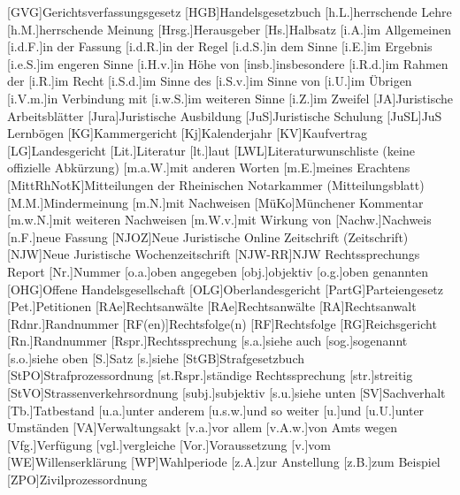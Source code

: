 \begin{acronym}[MittRhNotK]
[GVG]{Gerichtsverfassungsgesetz}
[HGB]{Handelsgesetzbuch}
[h.L.]{herrschende Lehre}
[h.M.]{herrschende Meinung}
[Hrsg.]{Herausgeber}
[Hs.]{Halbsatz}
[i.A.]{im Allgemeinen}
[i.d.F.]{in der Fassung}
[i.d.R.]{in der Regel}
[i.d.S.]{in dem Sinne}
[i.E.]{im Ergebnis}
[i.e.S.]{im engeren Sinne}
[i.H.v.]{in Höhe von}
[insb.]{insbesondere}
[i.R.d.]{im Rahmen der}
[i.R.]{im Recht}
[i.S.d.]{im Sinne des}
[i.S.v.]{im Sinne von}
[i.U.]{im Übrigen}
[i.V.m.]{in Verbindung mit}
[i.w.S.]{im weiteren Sinne}
[i.Z.]{im Zweifel}
[JA]{Juristische Arbeitsblätter}
[Jura]{Juristische Ausbildung}
[JuS]{Juristische Schulung}
[JuSL]{JuS Lernbögen}
[KG]{Kammergericht}
[Kj]{Kalenderjahr}
[KV]{Kaufvertrag}
[LG]{Landesgericht}
[Lit.]{Literatur}
[lt.]{laut}
[LWL]{Literaturwunschliste (keine offizielle Abkürzung)}
[m.a.W.]{mit anderen Worten}
[m.E.]{meines Erachtens}
[MittRhNotK]{Mitteilungen der Rheinischen Notarkammer (Mitteilungsblatt)}
[M.M.]{Mindermeinung}
[m.N.]{mit Nachweisen}
[MüKo]{Münchener Kommentar}
[m.w.N.]{mit weiteren Nachweisen}
[m.W.v.]{mit Wirkung von}
[Nachw.]{Nachweis}
[n.F.]{neue Fassung}
[NJOZ]{Neue Juristische Online Zeitschrift (Zeitschrift)}
[NJW]{Neue Juristische Wochenzeitschrift}
[NJW-RR]{NJW Rechtssprechungs Report}
[Nr.]{Nummer}
[o.a.]{oben angegeben}
[obj.]{objektiv}
[o.g.]{oben genannten}
[OHG]{Offene Handelsgesellschaft}
[OLG]{Oberlandesgericht}
[PartG]{Parteiengesetz}
[Pet.]{Petitionen}
[RAe]{Rechtsanwälte}
[RAe]{Rechtsanwälte}
[RA]{Rechtsanwalt}
[Rdnr.]{Randnummer}
[RF(en)]{Rechtsfolge(n)}
[RF]{Rechtsfolge}
[RG]{Reichsgericht}
[Rn.]{Randnummer}
[Rspr.]{Rechtssprechung}
[s.a.]{siehe auch}
[sog.]{sogenannt}
[s.o.]{siehe oben}
[S.]{Satz}
[s.]{siehe}
[StGB]{Strafgesetzbuch}
[StPO]{Strafprozessordnung}
[st.Rspr.]{ständige Rechtssprechung}
[str.]{streitig}
[StVO]{Strassenverkehrsordnung}
[subj.]{subjektiv}
[s.u.]{siehe unten}
[SV]{Sachverhalt}
[Tb.]{Tatbestand}
[u.a.]{unter anderem}
[u.s.w.]{und so weiter}
[u.]{und}
[u.U.]{unter Umständen}
[VA]{Verwaltungsakt}
[v.a.]{vor allem}
[v.A.w.]{von Amts wegen}
[Vfg.]{Verfügung}
[vgl.]{vergleiche}
[Vor.]{Voraussetzung}
[v.]{vom}
[WE]{Willenserklärung}
[WP]{Wahlperiode}
[z.A.]{zur Anstellung}
[z.B.]{zum Beispiel}
[ZPO]{Zivilprozessordnung}
\end{acronym}
